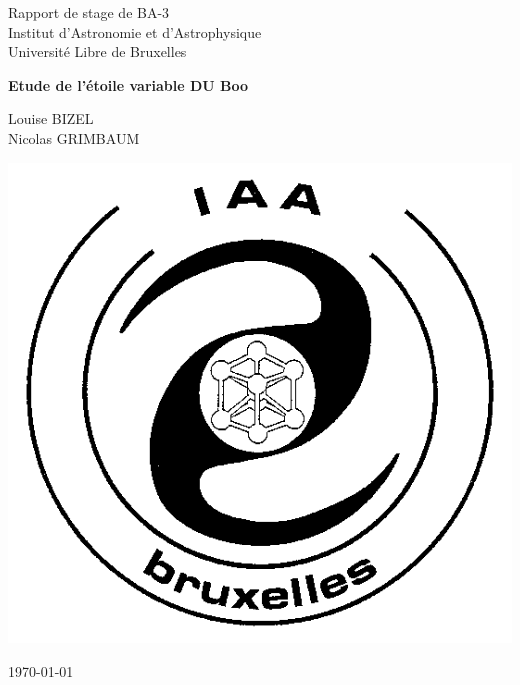 \documentclass[10pt,french, openany]{book}
\begin{document}

\begin{titlepage}
	\clearpage\thispagestyle{empty}
	\centering
	\vspace{1cm}
    \BgThispage

	{\normalsize Rapport de stage de BA-3 \\
		Institut d'Astronomie et d'Astrophysique \\
		Université Libre de Bruxelles \par}
		\vspace{3cm}
	{\Huge \textbf{Etude de l'étoile variable DU Boo}} \\
	\vspace{4cm}
	{\normalsize Louise BIZEL \\ %
	             Nicolas GRIMBAUM\par}
	\vspace{5cm}
    
    \centering \includegraphics[scale=0.2]{iaa_home_logo.png}
    
    \vspace{0.5cm}
		
	{\normalsize \today \par}
	
	\pagebreak

\end{titlepage}
\end{document}
